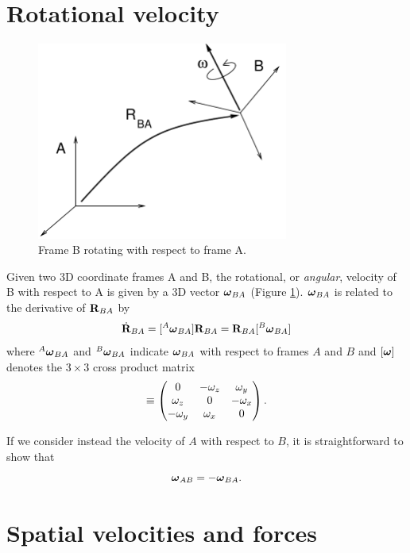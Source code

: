 \section{Rotational velocity}

\begin{figure}[ht]
\begin{center}
 \includegraphics[width=3.25in]{images/angularvelAB}
\end{center}
\caption{Frame B rotating with respect to frame A.}
\label{angularvelAB:fig}
\end{figure}

Given two 3D coordinate frames A and B, the rotational, or {\it
angular}, velocity of B with respect to A is given by a 3D vector
$\boldsymbol\omega_{BA}$ (Figure \ref{angularvelAB:fig}). $\boldsymbol\omega_{BA}$
is related to the derivative of ${\bf R}_{BA}$ by
%
\begin{equation}
\dot{{\bf R}}_{BA} = [{}^A\boldsymbol\omega_{BA}] {\bf R}_{BA} = {\bf R}_{BA} [{}^B\boldsymbol\omega_{BA}]
\end{equation}
%
where ${}^A\boldsymbol\omega_{BA}$ and ${}^B\boldsymbol\omega_{BA}$ indicate $\boldsymbol\omega_{BA}$ with
respect to frames $A$ and $B$ and $[ \boldsymbol\omega ]$ denotes the $3 \times 3$
cross product matrix
%
\begin{equation}
[ \Bom ] \equiv 
\matl
0 & -\omega_z & \omega_y \\
\omega_z & 0 & -\omega_x \\
-\omega_y & \omega_x & 0 \\
\matr.
\label{xprodmatrix:eqn}
\end{equation}
%

If we consider instead the velocity of $A$ with respect to $B$, it is
straightforward to show that
%
\begin{equation}
\boldsymbol\omega_{AB} = -\boldsymbol\omega_{BA}. 
\end{equation}
%

\section{Spatial velocities and forces}
\label{SpatialVelocitiesAndForces:sec}

